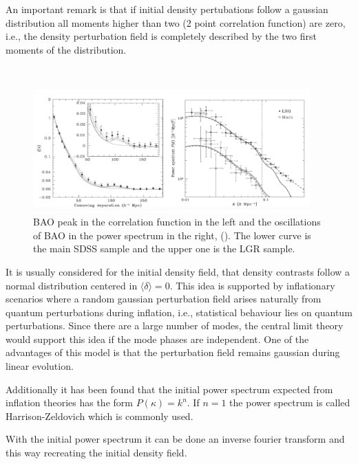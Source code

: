 An important remark is that if initial density pertubations follow a gaussian distribution 
all moments higher than two (2 point correlation function) are zero, i.e., the density
perturbation field is completely described by the two first moments of the distribution. 

\

\begin{figure}[htbp]
       \centering
               \includegraphics[width=0.95\textwidth]{./Images/chapter2/PS_CF.png}
       \caption{\small BAO peak in the correlation function in the left and the oscillations of BAO in the power spectrum in the right,
       (\cite{PLOT}).  
       The lower curve is the main SDSS sample and the upper one is the LGR sample. }
       \label{ps_cf}
 \end{figure}

It is usually considered for the initial density field, that density contrasts 
follow a normal distribution centered in $\langle \delta \rangle = 0$. This idea is supported by
inflationary scenarios where a random gaussian perturbation field arises naturally from quantum 
perturbations during inflation, i.e., statistical behaviour lies on quantum perturbations. 
Since there are a large number of modes, the central limit theory 
would support this idea if the mode phases are independent. 
One of the advantages of this model is that the perturbation field remains gaussian during linear evolution. 

Additionally it has been found that the initial power spectrum expected from inflation theories 
has the form $P(\kappa)= k^n$. If $n=1$ the power spectrum is called Harrison-Zeldovich which is 
commonly used. 

With the initial power spectrum it can be done an inverse fourier transform and this way recreating the initial density field. 

